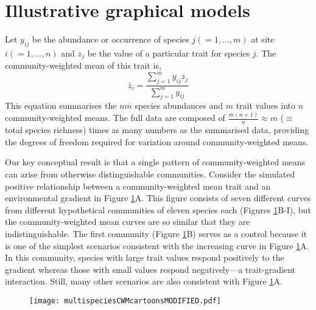 \documentclass[12pt]{ecology}
\begin{document}
\section{Illustrative graphical models}
\label{sec:graphmod}

Let $y_{ij}$ be the abundance or occurrence of species $j (= 1, ..., m)$ at site $i (= 1, ..., n)$ and $z_j$ be the value of a particular trait for species $j$.  The community-weighted mean of this trait is,
\begin{equation} 
\bar{z}_i = \frac{\sum_{j=1}^m y_{ij} z_j}{\sum_{j=1}^m y_{ij}}
\label{eq:cwmdef}
\end{equation}
This equation summarises the $nm$ species abundances and $m$ trait values into $n$ community-weighted means.  The full data are composed of $\frac{m(n + 1)}{n} \approx m$ ($\equiv$ total species richness) times as many numbers as the summarised data, providing the degrees of freedom required for variation around community-weighted means.


Our key conceptual result is that a single pattern of community-weighted means can arise from otherwise distinguishable communities.  Consider the simulated positive relationship between a community-weighted mean trait and an environmental gradient in Figure \ref{fig:graphicalmodels}A.  This figure consists of seven different curves from different hypothetical communities of eleven species each (Figures \ref{fig:graphicalmodels}B-I), but the community-weighted mean curves are so similar that they are indistinguishable.  The first community (Figure \ref{fig:graphicalmodels}B) serves as a control because it is one of the simplest scenarios consistent with the increasing curve in Figure \ref{fig:graphicalmodels}A.  In this community, species with large trait values respond positively to the gradient whereas those with small values respond negatively---a trait-gradient interaction.  Still, many other scenarios are also consistent with Figure \ref{fig:graphicalmodels}A.

\begin{figure}
\caption[The relationships between a community-weighted mean trait and an environmental gradient (A) for seven different metacommunities (B-H).  The lines in (A) are indistinguishable, indicating that information on the differences of the metacommunities is lost by community-weighted averaging.  The lines in B-H correspond to individual species, with trait values indicated by numbers.]{}
\texttt{[image: multispeciesCWMcartoonsMODIFIED.pdf]}
\label{fig:graphicalmodels}

\end{figure}
\end{document}
